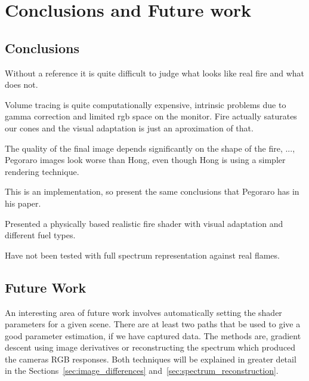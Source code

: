 \chapter{Conclusions and Future work}
\label{ch:conclusions}

\section{Conclusions}

Without a reference it is quite difficult to judge what looks like real fire and what does not.

Volume tracing is quite computationally expensive, intrinsic problems due to gamma correction and limited rgb space on the monitor.
Fire actually saturates our cones and the visual adaptation is just an aproximation of that.

The quality of the final image depends significantly on the shape of the fire, ..., Pegoraro images look worse than Hong, even though Hong is using a simpler rendering technique.

This is an implementation, so present the same conclusions that Pegoraro has in his paper.

Presented a physically based realistic fire shader with visual adaptation and different fuel types.

Have not been tested with full spectrum representation against real flames.
 

\section{Future Work}

An interesting area of future work involves automatically setting the shader parameters for a given scene.
There are at least two paths that be used to give a good parameter estimation, if we have captured data.
The methods are, gradient descent using image derivatives or reconstructing the spectrum which produced the cameras RGB responses.
Both techniques will be explained in greater detail in the Sections~\ref{sec:image_differences} and~\ref{sec:spectrum_reconstruction}.

